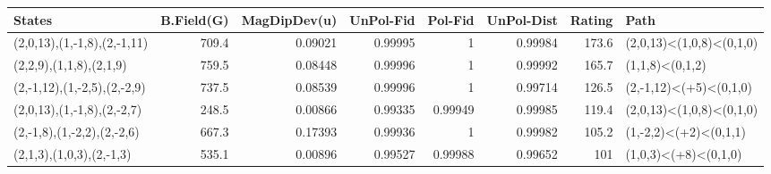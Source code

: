 \begin{tabular}{lrrrrrrl}
\hline
 States                      &   B.Field(G) &   MagDipDev(u) &   UnPol-Fid &   Pol-Fid &   UnPol-Dist &   Rating & Path                     \\
\hline
 (2,0,13),(1,-1,8),(2,-1,11) &        709.4 &        0.09021 &     0.99995 &   1       &      0.99984 &    173.6 & (2,0,13)<(1,0,8)<(0,1,0) \\
 (2,2,9),(1,1,8),(2,1,9)     &        759.5 &        0.08448 &     0.99996 &   1       &      0.99992 &    165.7 & (1,1,8)<(0,1,2)          \\
 (2,-1,12),(1,-2,5),(2,-2,9) &        737.5 &        0.08539 &     0.99996 &   1       &      0.99714 &    126.5 & (2,-1,12)<(+5)<(0,1,0)   \\
 (2,0,13),(1,-1,8),(2,-2,7)  &        248.5 &        0.00866 &     0.99335 &   0.99949 &      0.99985 &    119.4 & (2,0,13)<(1,0,8)<(0,1,0) \\
 (2,-1,8),(1,-2,2),(2,-2,6)  &        667.3 &        0.17393 &     0.99936 &   1       &      0.99982 &    105.2 & (1,-2,2)<(+2)<(0,1,1)    \\
 (2,1,3),(1,0,3),(2,-1,3)    &        535.1 &        0.00896 &     0.99527 &   0.99988 &      0.99652 &    101   & (1,0,3)<(+8)<(0,1,0)     \\
\hline
\end{tabular}